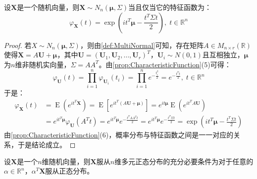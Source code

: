 \begin{theorem}\label{theo:c.f.MultiNormal}
	设$\mathbf{X}$是一个随机向量，则$\mathbf{X}\sim N_n(\boldsymbol{\mu},\Sigma)$当且仅当它的特征函数为：
	\begin{equation*}
		\varphi_\mathbf{X}(t)=\exp\left(it^T\boldsymbol{\mu}-\frac{t^T\Sigma t}{2}\right),\;t\in\mathbb{R}^{n}
	\end{equation*}
\end{theorem}
\begin{proof}
	若$X\sim N_n(\boldsymbol{\mu},\Sigma)$，则由\cref{def:MultiNormal}可知，存在矩阵$A\in M_{n\times r}(\mathbb{R})$使得$\mathbf{X}=A\mathbf{U}+\boldsymbol{\mu}$，其中$\mathbf{U}=(\mathbf{U}_1,\mathbf{U}_2,\dots,\mathbf{U}_r)^T$，$\mathbf{U}_i\sim N(0,1)$且互相独立，$\boldsymbol{\mu}$为$n$维非随机实向量，$\Sigma=AA^T$。由\cref{prop:CharacteristicFunction}(5)可得：
	\begin{equation*}
		\varphi_\mathbf{U}(t)=\prod_{i=1}^n\varphi_{\mathbf{U}_i}(t_i)
		=\prod_{i=1}^ne^{-\frac{t_i^2}{2}}=e^{-\frac{t^Tt}{2}},\;t\in\mathbb{R}^{n}
	\end{equation*}
	于是：
	\begin{align*}
		\varphi_\mathbf{X}(t)
		&=\operatorname{E}(e^{it^T\mathbf{X}})
		=\operatorname{E}[e^{it^T(A\mathbf{U}+\boldsymbol{\mu})}]
		=e^{it\boldsymbol{\mu}}\operatorname{E}(e^{it^TA\mathbf{U}}) \\
		&=e^{it^T\boldsymbol{\mu}}\varphi_\mathbf{U}(A^Tt)
		=e^{it^T\boldsymbol{\mu}}e^{-\frac{t^TAA^Tt}{2}}
		=e^{it^T\boldsymbol{\mu}}e^{-\frac{t^T\Sigma t}{2}}
		=\exp\left(it^T\boldsymbol{\mu}-\frac{t^T\Sigma t}{2}\right)
	\end{align*}
	由\cref{prop:CharacteristicFunction}(6)，概率分布与特征函数之间是一一对应的关系，于是结论成立。
\end{proof}
\begin{theorem}\label{theo:MultiNormal3}
	设$\mathbf{X}$是一个$n$维随机向量，则$\mathbf{X}$服从$n$维多元正态分布的充分必要条件为对于任意的$\alpha\in\mathbb{R}^{n}$，$\alpha^T\mathbf{X}$服从正态分布。
\end{theorem}
